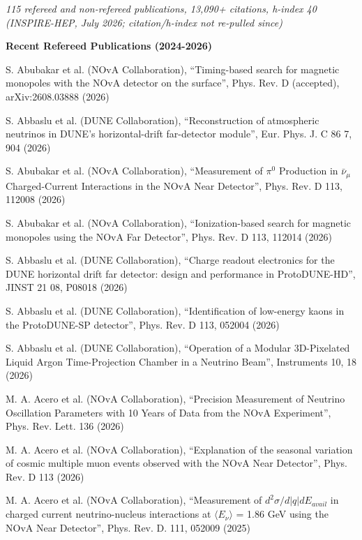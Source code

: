 {\em 115 refereed and non-refereed publications, 13,090+ citations, h-index 40 (INSPIRE-HEP, July 2026; citation/h-index not re-pulled since)}


{\bf Recent Refereed Publications (2024-2026)}
\begin{list2}
\item S. Abubakar et al. (NOvA Collaboration), ``Timing-based search for magnetic monopoles with the NOvA detector on the surface'', Phys. Rev. D (accepted), arXiv:2608.03888 (2026)
\item S. Abbaslu et al. (DUNE Collaboration), ``Reconstruction of atmospheric neutrinos in DUNE's horizontal-drift far-detector module'', Eur. Phys. J. C 86 7, 904 (2026)
\item S. Abubakar et al. (NOvA Collaboration), ``Measurement of $\pi^0$ Production in $\bar\nu_\mu$ Charged-Current Interactions in the NOvA Near Detector'', Phys. Rev. D 113, 112008 (2026)
\item S. Abubakar et al. (NOvA Collaboration), ``Ionization-based search for magnetic monopoles using the NOvA Far Detector'', Phys. Rev. D 113, 112014 (2026)
\item S. Abbaslu et al. (DUNE Collaboration), ``Charge readout electronics for the DUNE horizontal drift far detector: design and performance in ProtoDUNE-HD'', JINST 21 08, P08018 (2026)
\item S. Abbaslu et al. (DUNE Collaboration), ``Identification of low-energy kaons in the ProtoDUNE-SP detector'', Phys. Rev. D 113, 052004 (2026)
\item S. Abbaslu et al. (DUNE Collaboration), ``Operation of a Modular 3D-Pixelated Liquid Argon Time-Projection Chamber in a Neutrino Beam'', Instruments 10, 18 (2026)
\item M. A. Acero et al. (NOvA Collaboration), ``Precision Measurement of Neutrino Oscillation Parameters with 10 Years of Data from the NOvA Experiment'', Phys. Rev. Lett. 136 (2026)
\item M. A. Acero et al. (NOvA Collaboration), ``Explanation of the seasonal variation of cosmic multiple muon events observed with the NOvA Near Detector'', Phys. Rev. D 113 (2026)
\item M. A. Acero et al. (NOvA Collaboration), ``Measurement of $d^2\sigma/d|q|dE_{avail}$ in charged current neutrino-nucleus interactions at $\langle E_\nu\rangle$ = 1.86 GeV using the NOvA Near Detector'', Phys. Rev. D. 111, 052009 (2025)

\end{list2}
